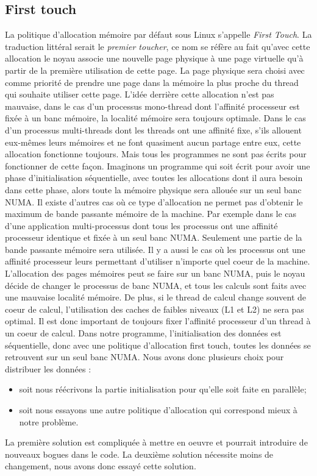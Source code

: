 \subsection{First touch}
La politique d'allocation mémoire par défaut sous Linux s'appelle {\em First Touch}.
%
La traduction littéral serait le {\em premier toucher}, ce nom se réfère au fait qu'avec cette allocation le noyau associe une nouvelle page physique à une page virtuelle qu'à partir de la première utilisation de cette page.
%
La page physique sera choisi avec comme priorité de prendre une page dans la mémoire la plus proche du thread qui souhaite utiliser cette page.
%
L'idée derrière cette allocation n'est pas mauvaise, dans le cas d'un processus mono-thread dont l'affinité processeur est fixée à un banc mémoire, la localité mémoire sera toujours optimale.
%
Dans le cas d'un processus multi-threads dont les threads ont une affinité fixe, s'ils allouent eux-mêmes leurs mémoires et ne font quasiment aucun partage entre eux, cette allocation fonctionne toujours.
%
Mais tous les programmes ne sont pas écrits pour fonctionner de cette façon.
%
Imaginons un programme qui soit écrit pour avoir une phase d'initialisation séquentielle, avec toutes les allocations dont il aura besoin dans cette phase, alors toute la mémoire physique sera allouée sur un seul banc NUMA.
%
Il existe d'autres cas où ce type d'allocation ne permet pas d'obtenir le maximum de bande passante mémoire de la machine.
%
Par exemple dans le cas d'une application multi-processus dont tous les processus ont une affinité processeur identique et fixée à un seul banc NUMA.
%
Seulement une partie de la bande passante mémoire sera utilisée.
%
Il y a aussi le cas où les processus ont une affinité processeur leurs permettant d'utiliser n'importe quel coeur de la machine.
%
L'allocation des pages mémoires peut se faire sur un banc NUMA, puis le noyau décide de changer le processus de banc NUMA, et tous les calculs sont faits avec une mauvaise localité mémoire.
%
De plus, si le thread de calcul change souvent de coeur de calcul, l'utilisation des caches de faibles niveaux (L1 et L2) ne sera pas optimal.
%
Il est donc important de toujours fixer l'affinité processeur d'un thread à un coeur de calcul.
%
Dans notre programme, l'initialisation des données est séquentielle, donc avec une politique d'allocation first touch, toutes les données se retrouvent sur un seul banc NUMA.
%
Nous avons donc plusieurs choix pour distribuer les données :
\begin{itemize}
  \item soit nous réécrivons la partie initialisation pour qu'elle soit faite en parallèle;
  \item soit nous essayons une autre politique d'allocation qui correspond mieux à notre problème.
\end{itemize}
%
La première solution est compliquée à mettre en oeuvre et pourrait introduire de nouveaux bogues dans le code.
%
La deuxième solution nécessite moins de changement, nous avons donc essayé cette solution.
